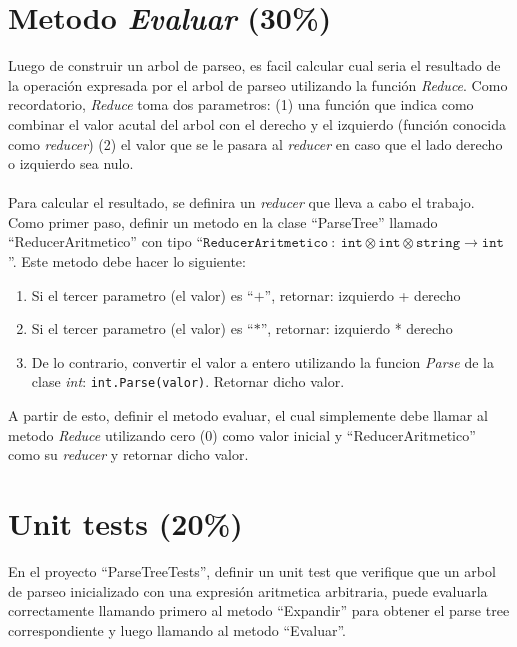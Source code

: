 \documentclass{article}
\begin{document}
\section*{Metodo \emph{Evaluar} (30\%)}
Luego de construir un arbol de parseo, es facil calcular cual seria el resultado
de la operaci\'on expresada por el arbol de parseo utilizando la funci\'on
\emph{Reduce}. Como recordatorio, \emph{Reduce} toma dos parametros: (1) una
funci\'on que indica como combinar el valor acutal del arbol con el derecho
y el izquierdo (funci\'on conocida como \emph{reducer}) (2) el valor que se
le pasara al \emph{reducer} en caso que el lado derecho o izquierdo sea nulo.
\\\\
Para calcular el resultado, se definira un \emph{reducer} que lleva a cabo
el trabajo. Como primer paso, definir un metodo en la clase ``ParseTree''
llamado ``ReducerAritmetico'' con tipo ``$\mathtt{ReducerAritmetico}
\ :\ \mathtt{int}\otimes\mathtt{int}\otimes\mathtt{string}\rightarrow\mathtt{int}$''.
Este metodo debe hacer lo siguiente:
\begin{enumerate}
        \item{Si el tercer parametro (el valor) es ``$+$'', retornar: izquierdo + derecho}
        \item{Si el tercer parametro (el valor) es ``$*$'', retornar: izquierdo * derecho}
        \item{De lo contrario, convertir el valor a entero utilizando la funcion \emph{Parse}
        de la clase \emph{int}: \texttt{int.Parse(valor)}. Retornar dicho valor.}
\end{enumerate}
A partir de esto, definir el metodo evaluar, el cual simplemente debe llamar
al metodo \emph{Reduce} utilizando cero (0) como valor inicial y ``ReducerAritmetico''
como su \emph{reducer} y retornar dicho valor.

\section*{Unit tests (20\%)}
En el proyecto ``ParseTreeTests'', definir un unit test que verifique que
un arbol de parseo inicializado con una expresi\'on aritmetica arbitraria,
puede evaluarla correctamente llamando primero al metodo ``Expandir'' para obtener
el parse tree correspondiente y luego llamando al metodo ``Evaluar''.
\end{document}
